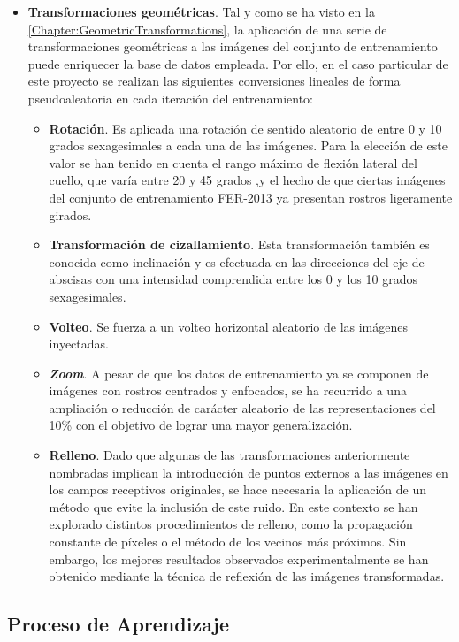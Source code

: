 \begin{itemize}
  \item \textbf{Transformaciones geométricas}. Tal y como se ha visto en la \autoref{Chapter:GeometricTransformations}, la aplicación de una serie de transformaciones geométricas a las imágenes del conjunto de entrenamiento puede enriquecer la base de datos empleada. Por ello, en el caso particular de este proyecto se realizan las siguientes conversiones lineales de forma pseudoaleatoria en cada iteración del entrenamiento:
        \begin{itemize}
          \item \textbf{Rotación}. Es aplicada una rotación de sentido aleatorio de entre 0 y 10 grados sexagesimales a cada una de las imágenes. Para la elección de este valor se han tenido en cuenta el rango máximo de flexión lateral del cuello, que varía entre 20 y 45 grados \cite{LateralFlexion},y el hecho de que ciertas imágenes del conjunto de entrenamiento FER-2013 ya presentan rostros ligeramente girados.
          \item \textbf{Transformación de cizallamiento}. Esta transformación también es conocida como inclinación y es efectuada en las direcciones del eje de abscisas con una intensidad comprendida entre los 0 y los 10 grados sexagesimales.
          \item \textbf{Volteo}. Se fuerza a un volteo horizontal aleatorio de las imágenes inyectadas. 
          \item \textbf{\textit{Zoom}}. A pesar de que los datos de entrenamiento ya se componen de imágenes con rostros centrados y enfocados, se ha recurrido a una ampliación o reducción de carácter aleatorio de las representaciones del 10\% con el objetivo de lograr una mayor generalización.
          \item \textbf{Relleno}. Dado que algunas de las transformaciones anteriormente nombradas implican la introducción de puntos externos a las imágenes en los campos receptivos originales, se hace necesaria la aplicación de un método que evite la inclusión de este ruido. En este contexto se han explorado distintos procedimientos de relleno, como la propagación constante de píxeles o el método de los vecinos más próximos. Sin embargo, los mejores resultados observados experimentalmente se han obtenido mediante la técnica de reflexión de las imágenes transformadas.
        \end{itemize}
\end{itemize}

\subsection{Proceso de Aprendizaje}


